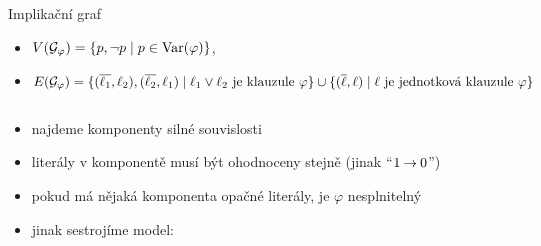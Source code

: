 \documentclass{beamer}
\begin{document}
\begin{frame}{Implikační graf}

\begin{itemize}
    \item $V(\mathcal G_\varphi) = \{p, \neg p \mid p\in\operatorname{Var}(\varphi)\}$,
    \item $E(\mathcal G_\varphi) = \{(\overline{\ell_1},\ell_2), (\overline{\ell_2},\ell_1)\mid \ell_1\lor \ell_2\text{ je klauzule }\varphi\}\mathbin{\cup}\{(\overline{\ell},\ell)\mid \ell \text{ je jednotková klauzule }\varphi\}$
\end{itemize} 

\medskip
{}
\vspace{-18pt}
\begin{columns}
    \begin{column}{0.45\textwidth}
    
    \begin{itemize}
        \item najdeme komponenty silné souvislosti
        \item literály v komponentě musí být ohodnoceny stejně (jinak ``$1\mathbin{\rightarrow} 0$'')
        \item pokud má nějaká komponenta opačné literály, je $\varphi$ nesplnitelný
        \item jinak sestrojíme model:
    \end{itemize}
    

\end{column}
\end{columns}
\end{frame}
\end{document}
